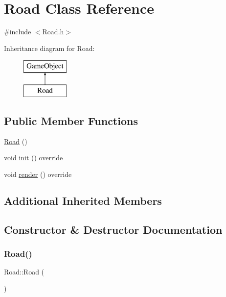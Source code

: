\hypertarget{class_road}{}\section{Road Class Reference}
\label{class_road}


{\ttfamily \#include $<$Road.\+h$>$}

Inheritance diagram for Road\+:\begin{figure}[H]
\begin{center}
\leavevmode
\includegraphics[height=2.000000cm]{class_road}
\end{center}
\end{figure}
\subsection*{Public Member Functions}
\begin{DoxyCompactItemize}
\item 
\hyperlink{class_road_a90bb6be2a5c3b6997849a915e2af0cf0}{Road} ()
\item 
void \hyperlink{class_road_a2d72b47fce205751e504929e91a7e567}{init} () override
\item 
void \hyperlink{class_road_a2ca4cc3c6043f6d1044992073e9fe3ba}{render} () override
\end{DoxyCompactItemize}
\subsection*{Additional Inherited Members}


\subsection{Constructor \& Destructor Documentation}
\mbox{\label{class_road_a90bb6be2a5c3b6997849a915e2af0cf0}} 
\subsubsection{\texorpdfstring{Road()}{Road()}}
{\footnotesize\ttfamily Road\+::\+Road (\begin{DoxyParamCaption}{ }\end{DoxyParamCaption})\hspace{0.3cm}{\ttfamily [inline]}}



